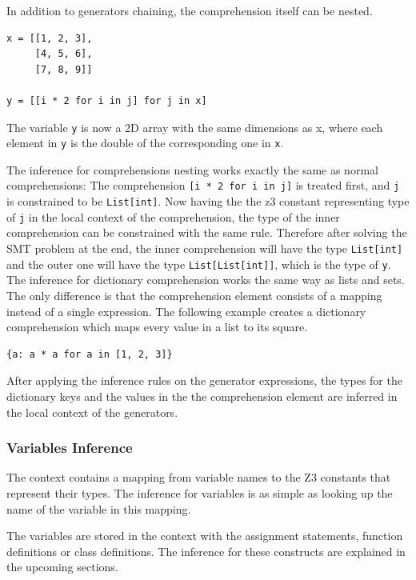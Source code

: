 In addition to generators chaining, the comprehension itself can be nested.
\begin{lstlisting}
x = [[1, 2, 3],
     [4, 5, 6],
     [7, 8, 9]]
	 
y = [[i * 2 for i in j] for j in x]	 
\end{lstlisting}
The variable \lstinline|y| is now a 2D array with the same dimensions as x, where each element in \lstinline|y| is the double of the corresponding one in \lstinline|x|.

The inference for comprehensions nesting works exactly the same as normal comprehensions: The comprehension \lstinline|[i * 2 for i in j]| is treated first, and \lstinline|j| is constrained to be \lstinline|List[int]|. Now having the the z3 constant representing type of \lstinline|j| in the local context of the comprehension, the type of the inner comprehension can be constrained with the same rule. Therefore after solving the SMT problem at the end, the inner comprehension will have the type \lstinline|List[int]| and the outer one will have the type \lstinline|List[List[int]]|, which is the type of \lstinline|y|.\\

The inference for dictionary comprehension works the same way as lists and sets. The only difference is that the comprehension element consists of a mapping instead of a single expression. The following example creates a dictionary comprehension which maps every value in a list to its square.
\begin{lstlisting}
{a: a * a for a in [1, 2, 3]}
\end{lstlisting}

After applying the inference rules on the generator expressions, the types for the dictionary keys and the values in the the comprehension element are inferred in the local context of the generators.

\subsubsection{Variables Inference}
The context contains a mapping from variable names to the Z3 constants that represent their types. The inference for variables is as simple as looking up the name of the variable in this mapping.

The variables are stored in the context with the assignment statements, function definitions or class definitions. The inference for these constructs are explained in the upcoming sections.

